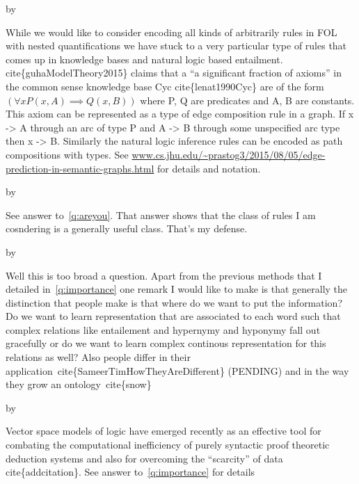 \documentclass[12pt]{exam} %
\makeatletter
\renewcommand{\cite}[1]{cite\{#1\}}
\def\SetTotalwidth{\advance\linewidth by \@totalleftmargin
\@totalleftmargin=0pt}
\newcommand{\answer}[1]{
\ifprintanswers
\SetTotalwidth
  \begin{solution}[0in]#1\end{solution}
\else \fi
}
\makeatother
\begin{document}
\begin{questions}
   \answer{While we would
    like to consider encoding all kinds of arbitrarily rules in FOL
    with nested quantifications we have stuck to a very particular
    type of rules that comes up in knowledge bases and natural logic
    based entailment. \cite{guhaModelTheory2015} claims that a ``a
    significant fraction of axioms'' in the common sense knowledge
    base Cyc \cite{lenat1990Cyc} are of the form
    $(\forall x P(x,A) \implies Q(x,B))$ where P, Q are predicates and
    A, B are constants. This axiom can be represented as a type of
    edge composition rule in a graph. If x -> A through an arc of type
    P and A -> B through some unspecified arc type then x ->
    B. Similarly the natural logic inference rules can be encoded as
    path compositions with types. See
    \url{www.cs.jhu.edu/~prastog3/2015/08/05/edge-prediction-in-semantic-graphs.html}
    for details and notation.  }

      \answer{See answer to~\ref{q:areyou}. That
    answer shows that the class of rules I am cosndering is a
    generally useful class. That's my defense.}

  \answer{Well this is too broad a question. Apart from the previous
    methods that I detailed in~\ref{q:importance} one remark I would
    like to make is that generally the distinction that people make is
    that where do we want to put the information? Do we want to learn
    representation that are associated to each word such that complex
    relations like entailement and hypernymy and hyponymy fall out
    gracefully or do we want to learn complex continous representation
    for this relations as well? Also people differ in their
    application~\cite{SameerTimHowTheyAreDifferent} (PENDING) and in
    the way they grow an ontology~\cite{snow} }

  \answer{Vector space models of logic have emerged recently as an
    effective tool for combating the computational inefficiency of
    purely syntactic proof theoretic deduction systems and also for
    overcoming the ``scarcity'' of data \cite{addcitation}. See answer
    to~\ref{q:importance} for details}


\end{questions}
\end{document}
